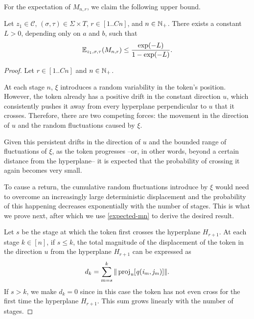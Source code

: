 	For the expectation of $M_{n, r}$, we claim the following upper bound.

\begin{lemma} \label{finite-number-of-Lrossings}
	Let $z_1 \in \mathscr{C}$, $(\sigma, \tau) \in \Sigma \times T$, $r \in [1..Cn]$, and $n \in \N_+$. There exists a constant $L > 0$, depending only on $a$ and $b$, such that
	\begin{equation}\label{EMn}
		\E_{z_1, \sigma, \tau}(M_{n, r}) \leq \frac{\exp(-L)}{1 - \exp(-L)}.
	\end{equation}
\end{lemma}

	\begin{proof} Let $r \in [1..Cn]$ and $n \in \N_+$.

	At each stage $n$, $\xi$ introduces a random variability in the token's position. However, the token already has a positive drift in the constant direction $u$, which consistently pushes it away from every hyperplane perpendicular to $u$ that it crosses. Therefore, there are two competing forces: the movement in the direction of $u$ and the random fluctuations caused by $\xi$. 

	Given this persistent drifts in the direction of $u$ and the bounded range of fluctuations of $\xi$, as the token progresses --or, in other words, beyond a certain distance from the hyperplane-- it is expected that the probability of crossing it again becomes very small. 

	To cause a return, the cumulative random fluctuations introduce by $\xi$ would need to overcome an increasingly large deterministic displacement and the probability of this happening decreases exponentially with the number of stages. This is what we prove next, after which we use \eqref{expected-mn} to derive the desired result.


	Let $s$ be the stage at which the token first crosses the hyperplane $H_{r+1}$. At each stage $k \in [n]$, if $s \leq k$, the total magnitude of the displacement of the token in the direction $u$ from the hyperplane $H_{r+1}$ can be expressed as
	\[
		d_k = \sum_{m=s}^k \|\vectproj[u]{q(i_m, j_m)}\|.
	\]
	If $s > k$, we make $d_k = 0$ since in this case the token has not even cross for the first time the hyperplane $H_{r+1}$. This sum grows linearly with the number of stages.


\end{proof}
